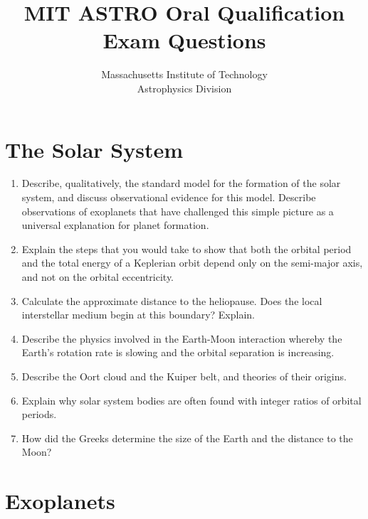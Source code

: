 \documentclass[10pt, oneside]{book}
\title{\textbf{MIT ASTRO Oral Qualification Exam Questions}}
\author{Massachusetts Institute of Technology \\ Astrophysics Division}
\date{}
\begin{document}
\maketitle 


\setcounter{page}{1}

\section{The Solar System}

\begin{enumerate}[start=1]
    \item Describe, qualitatively, the standard model for the formation of the solar system, and discuss observational evidence for this model. Describe observations of exoplanets that have challenged this simple picture as a universal explanation for planet formation.
    \item Explain the steps that you would take to show that both the orbital period and the total energy of a Keplerian orbit depend only on the semi-major axis, and not on the orbital eccentricity.
    \item Calculate the approximate distance to the heliopause. Does the local interstellar medium begin at this boundary? Explain.
    \item Describe the physics involved in the Earth-Moon interaction whereby the Earth's rotation rate is slowing and the orbital separation is increasing.
    \item Describe the Oort cloud and the Kuiper belt, and theories of their origins.
    \item Explain why solar system bodies are often found with integer ratios of orbital periods.
    \item How did the Greeks determine the size of the Earth and the distance to the Moon?
\end{enumerate}

\section{Exoplanets}
\end{document}
